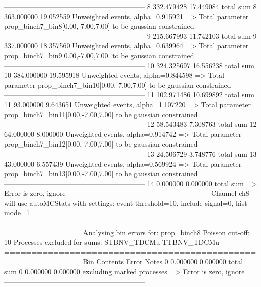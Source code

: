 ------------------------------------------------------------
8          332.479428      17.449084       total sum                     
8          363.000000      19.052559       Unweighted events, alpha=0.915921
  => Total parameter prop_binch7_bin8[0.00,-7.00,7.00] to be gaussian constrained
------------------------------------------------------------
9          215.667993      11.742103       total sum                     
9          337.000000      18.357560       Unweighted events, alpha=0.639964
  => Total parameter prop_binch7_bin9[0.00,-7.00,7.00] to be gaussian constrained
------------------------------------------------------------
10         324.325697      16.556238       total sum                     
10         384.000000      19.595918       Unweighted events, alpha=0.844598
  => Total parameter prop_binch7_bin10[0.00,-7.00,7.00] to be gaussian constrained
------------------------------------------------------------
11         102.971486      10.699892       total sum                     
11         93.000000       9.643651        Unweighted events, alpha=1.107220
  => Total parameter prop_binch7_bin11[0.00,-7.00,7.00] to be gaussian constrained
------------------------------------------------------------
12         58.543483       7.308763        total sum                     
12         64.000000       8.000000        Unweighted events, alpha=0.914742
  => Total parameter prop_binch7_bin12[0.00,-7.00,7.00] to be gaussian constrained
------------------------------------------------------------
13         24.506729       3.748776        total sum                     
13         43.000000       6.557439        Unweighted events, alpha=0.569924
  => Total parameter prop_binch7_bin13[0.00,-7.00,7.00] to be gaussian constrained
------------------------------------------------------------
14         0.000000        0.000000        total sum                     
  => Error is zero, ignore      
------------------------------------------------------------
Channel ch8 will use autoMCStats with settings: event-threshold=10, include-signal=0, hist-mode=1
============================================================
Analysing bin errors for: prop_binch8
Poisson cut-off: 10
Processes excluded for sums: STBNV_TDCMu TTBNV_TDCMu
============================================================
Bin        Contents        Error           Notes                         
0          0.000000        0.000000        total sum                     
0          0.000000        0.000000        excluding marked processes    
  => Error is zero, ignore      
------------------------------------------------------------
